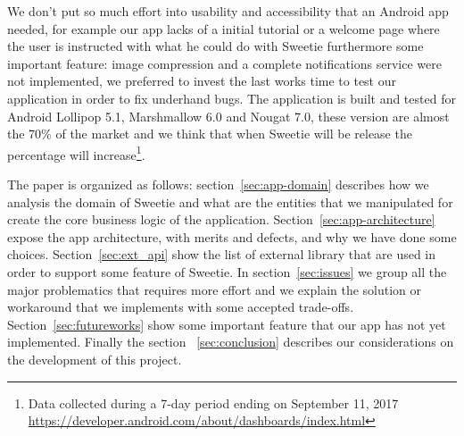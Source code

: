 We don't put so much effort into usability and accessibility that an Android app needed, for example our app lacks of a initial tutorial or a welcome page where the user is instructed with what he could do with Sweetie furthermore some important feature: image compression and a complete notifications service were not implemented, we preferred to invest the last works time to test our application in order to fix underhand bugs. The application is built and tested for Android Lollipop 5.1, Marshmallow 6.0 and Nougat 7.0, these version are almost the 70\% of the market and we think that when Sweetie will be release the percentage will increase\footnote{Data collected during a 7-day period ending on September 11, 2017 \url{https://developer.android.com/about/dashboards/index.html}}. 

The paper is organized as follows: section~\ref{sec:app-domain} describes how we analysis the domain of Sweetie and what are the entities that we manipulated for create the core business logic of the application. Section~\ref{sec:app-architecture} expose the app architecture, with merits and defects, and why we have done some choices. Section~\ref{sec:ext_api} show the list of external library that are used in order to support some feature of Sweetie. In section~\ref{sec:issues} we group all the major problematics that requires more effort and we explain the solution or workaround that we implements with some accepted trade-offs. Section~\ref{sec:futureworks}  show some important feature that our app has not yet implemented. Finally the section ~\ref{sec:conclusion} describes our considerations on the development of this project.
